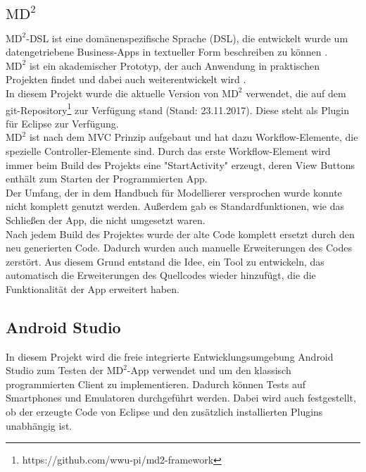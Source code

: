 \documentclass[a4paper,twoside]{article}
\begin{document}
	\subsection{$\text{MD}^2$}
	$\text{MD}^2$-DSL ist eine dom\"anenspezifische Sprache (DSL), die entwickelt wurde um datengetriebene Business-Apps in textueller Form beschreiben zu k\"onnen \cite{DSLMD2_2013}.\\
	$\text{MD}^2$ ist ein akademischer Prototyp, der auch Anwendung in praktischen Projekten findet und dabei auch weiterentwickelt wird \cite{MDCP2015}.\\
	In diesem Projekt wurde die aktuelle Version von $\text{MD}^2$ verwendet, die auf dem git-Repository\footnote{https://github.com/wwu-pi/md2-framework} zur Verf\"ugung stand (Stand: 23.11.2017). Diese steht als Plugin f\"ur Eclipse zur Verf\"ugung.\\
	$\text{MD}^2$ ist nach dem MVC Prinzip aufgebaut und hat dazu Workflow-Elemente, die spezielle Controller-Elemente sind\cite{Handbookmd2}. Durch das erste Workflow-Element wird immer beim Build des Projekts eine "StartActivity" erzeugt, deren View Buttons enth\"alt zum Starten der Programmierten App.\\
	Der Umfang, der in dem Handbuch f\"ur Modellierer versprochen wurde konnte nicht komplett genutzt werden. Au\ss{}erdem gab es Standardfunktionen, wie das Schlie\ss{}en der App, die nicht umgesetzt waren.\\
	Nach jedem Build des Projektes wurde der alte Code komplett ersetzt durch den neu generierten Code. Dadurch wurden auch manuelle Erweiterungen des Codes zerst\"ort. Aus diesem Grund entstand die Idee, ein Tool zu entwickeln, das automatisch die Erweiterungen des Quellcodes wieder hinzuf\"ugt, die die Funktionalit\"at der App erweitert haben.
	
	\subsection{Android Studio}
	In diesem Projekt wird die freie integrierte Entwicklungsumgebung Android Studio zum Testen der $\text{MD}^2$-App verwendet und um den klassisch programmierten Client zu implementieren. Dadurch k\"onnen Tests auf Smartphones und Emulatoren durchgef\"uhrt werden. Dabei wird auch festgestellt, ob der erzeugte Code von Eclipse und den zus\"atzlich installierten Plugins unabh\"angig ist.
	
\end{document}
